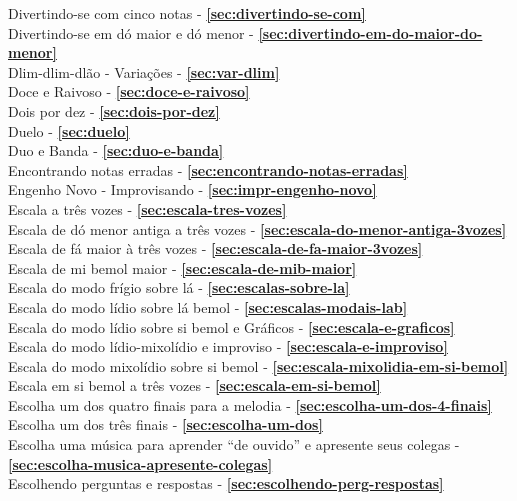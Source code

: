 Divertindo-se com cinco notas - \textbf{\ref{sec:divertindo-se-com}} \\
Divertindo-se em dó maior e dó menor - \textbf{\ref{sec:divertindo-em-do-maior-do-menor}} \\
Dlim-dlim-dlão - Variações - \textbf{\ref{sec:var-dlim}} \\
Doce e Raivoso - \textbf{\ref{sec:doce-e-raivoso}} \\
Dois por dez - \textbf{\ref{sec:dois-por-dez}} \\
Duelo - \textbf{\ref{sec:duelo}} \\
Duo e Banda - \textbf{\ref{sec:duo-e-banda}} \\
Encontrando notas erradas - \textbf{\ref{sec:encontrando-notas-erradas}} \\
Engenho Novo - Improvisando - \textbf{\ref{sec:impr-engenho-novo}} \\
Escala a três vozes - \textbf{\ref{sec:escala-tres-vozes}} \\
Escala de dó menor antiga a três vozes - \textbf{\ref{sec:escala-do-menor-antiga-3vozes}} \\
Escala de fá maior à três vozes - \textbf{\ref{sec:escala-de-fa-maior-3vozes}} \\
Escala de mi bemol maior - \textbf{\ref{sec:escala-de-mib-maior}} \\
Escala do modo frígio sobre lá - \textbf{\ref{sec:escalas-sobre-la}} \\
Escala do modo lídio sobre lá bemol - \textbf{\ref{sec:escalas-modais-lab}} \\
Escala do modo lídio sobre si bemol e Gráficos - \textbf{\ref{sec:escala-e-graficos}} \\
Escala do modo lídio-mixolídio e improviso - \textbf{\ref{sec:escala-e-improviso}} \\
Escala do modo mixolídio sobre si bemol - \textbf{\ref{sec:escala-mixolidia-em-si-bemol}} \\
Escala em si bemol a três vozes - \textbf{\ref{sec:escala-em-si-bemol}} \\
Escolha um dos quatro finais para a melodia - \textbf{\ref{sec:escolha-um-dos-4-finais}} \\
Escolha um dos três finais - \textbf{\ref{sec:escolha-um-dos}} \\
Escolha uma música para aprender ``de ouvido'' e apresente seus
colegas - \textbf{\ref{sec:escolha-musica-apresente-colegas}} \\
Escolhendo perguntas e respostas - \textbf{\ref{sec:escolhendo-perg-respostas}} \\
